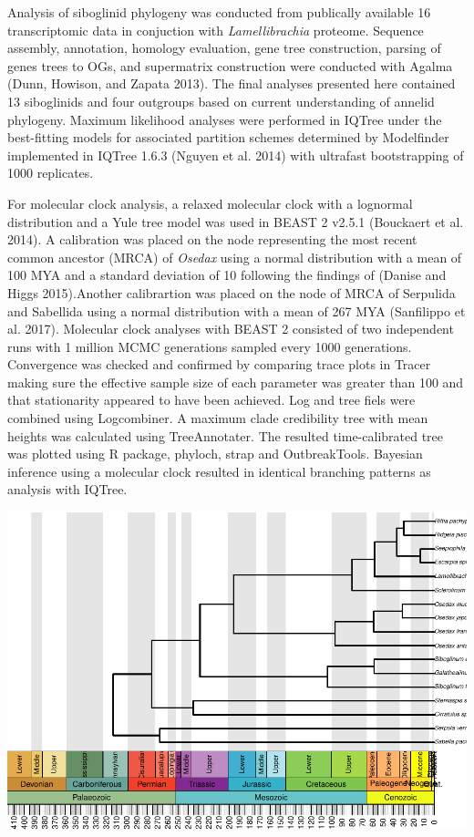 \documentclass[]{article}
\begin{document}
Analysis of siboglinid phylogeny was conducted from publically available
16 transcriptomic data in conjuction with \emph{Lamellibrachia}
proteome. Sequence assembly, annotation, homology evaluation, gene tree
construction, parsing of genes trees to OGs, and supermatrix
construction were conducted with Agalma (Dunn, Howison, and Zapata
2013). The final analyses presented here contained 13 siboglinids and
four outgroups based on current understanding of annelid phylogeny.
Maximum likelihood analyses were performed in IQTree under the
best-fitting models for associated partition schemes determined by
Modelfinder implemented in IQTree 1.6.3 (Nguyen et al. 2014) with
ultrafast bootstrapping of 1000 replicates.

For molecular clock analysis, a relaxed molecular clock with a lognormal
distribution and a Yule tree model was used in BEAST 2 v2.5.1 (Bouckaert
et al. 2014). A calibration was placed on the node representing the most
recent common ancestor (MRCA) of \emph{Osedax} using a normal
distribution with a mean of 100 MYA and a standard deviation of 10
following the findings of (Danise and Higgs 2015).Another calibrartion
was placed on the node of MRCA of Serpulida and Sabellida using a normal
distribution with a mean of 267 MYA (Sanfilippo et al. 2017). Molecular
clock analyses with BEAST 2 consisted of two independent runs with 1
million MCMC generations sampled every 1000 generations. Convergence was
checked and confirmed by comparing trace plots in Tracer making sure the
effective sample size of each parameter was greater than 100 and that
stationarity appeared to have been achieved. Log and tree fiels were
combined using Logcombiner. A maximum clade credibility tree with mean
heights was calculated using TreeAnnotater. The resulted time-calibrated
tree was plotted using R package, phyloch, strap and OutbreakTools.
Bayesian inference using a molecular clock resulted in identical
branching patterns as analysis with IQTree.

\includegraphics{manuscript_files/figure-latex/preliminaries-1.pdf}
\end{document}

